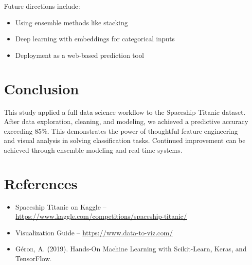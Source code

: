 \documentclass[12pt]{article}
\begin{document}
Future directions include:
\begin{itemize}
    \item Using ensemble methods like stacking
    \item Deep learning with embeddings for categorical inputs
    \item Deployment as a web-based prediction tool
\end{itemize}

\section{Conclusion}
This study applied a full data science workflow to the Spaceship Titanic dataset. After data exploration, cleaning, and modeling, we achieved a predictive accuracy exceeding 85\%. This demonstrates the power of thoughtful feature engineering and visual analysis in solving classification tasks. Continued improvement can be achieved through ensemble modeling and real-time systems.

\section*{References}
\begin{itemize}
    \item Spaceship Titanic on Kaggle – \url{https://www.kaggle.com/competitions/spaceship-titanic/}
    \item Visualization Guide – \url{https://www.data-to-viz.com/}
    \item Géron, A. (2019). Hands-On Machine Learning with Scikit-Learn, Keras, and TensorFlow.
\end{itemize}
\end{document}
